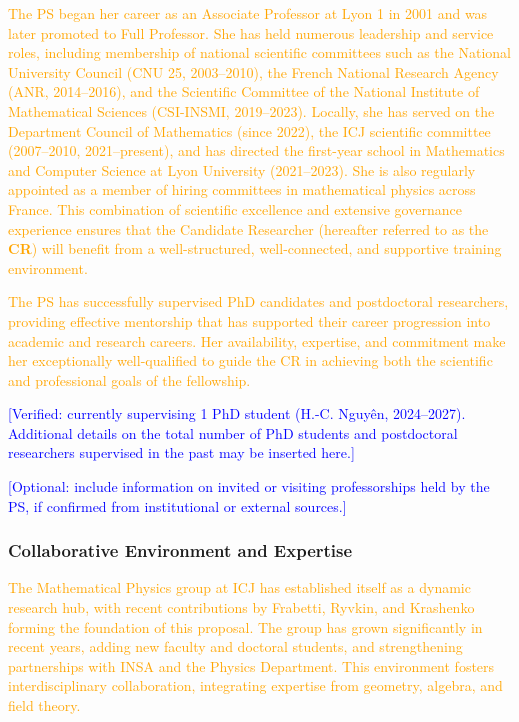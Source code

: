 \documentclass[11pt,draftproposal]{msca-pf}
\begin{document}
\textcolor{orange}{The PS began her career as an Associate Professor at Lyon 1 in 2001 and was later promoted to Full Professor. She has held numerous leadership and service roles, including membership of national scientific committees such as the National University Council (CNU 25, 2003–2010), the French National Research Agency (ANR, 2014–2016), and the Scientific Committee of the National Institute of Mathematical Sciences (CSI-INSMI, 2019–2023). Locally, she has served on the Department Council of Mathematics (since 2022), the ICJ scientific committee (2007–2010, 2021–present), and has directed the first-year school in Mathematics and Computer Science at Lyon University (2021–2023). She is also regularly appointed as a member of hiring committees in mathematical physics across France. This combination of scientific excellence and extensive governance experience ensures that the Candidate Researcher (hereafter referred to as the \textbf{CR}) will benefit from a well-structured, well-connected, and supportive training environment.}  

\textcolor{orange}{The PS has successfully supervised PhD candidates and postdoctoral researchers, providing effective mentorship that has supported their career progression into academic and research careers. Her availability, expertise, and commitment make her exceptionally well-qualified to guide the CR in achieving both the scientific and professional goals of the fellowship.}  

\textcolor{blue}{[Verified: currently supervising 1 PhD student (H.-C. Nguyên, 2024–2027). Additional details on the total number of PhD students and postdoctoral researchers supervised in the past may be inserted here.]}  

\textcolor{blue}{[Optional: include information on invited or visiting professorships held by the PS, if confirmed from institutional or external sources.]}  

\subsubsection*{Collaborative Environment and Expertise}

\textcolor{orange}{The Mathematical Physics group at ICJ has established itself as a dynamic research hub, with recent contributions by Frabetti, Ryvkin, and Krashenko forming the foundation of this proposal. The group has grown significantly in recent years, adding new faculty and doctoral students, and strengthening partnerships with INSA and the Physics Department. This environment fosters interdisciplinary collaboration, integrating expertise from geometry, algebra, and field theory.}  
\end{document}

